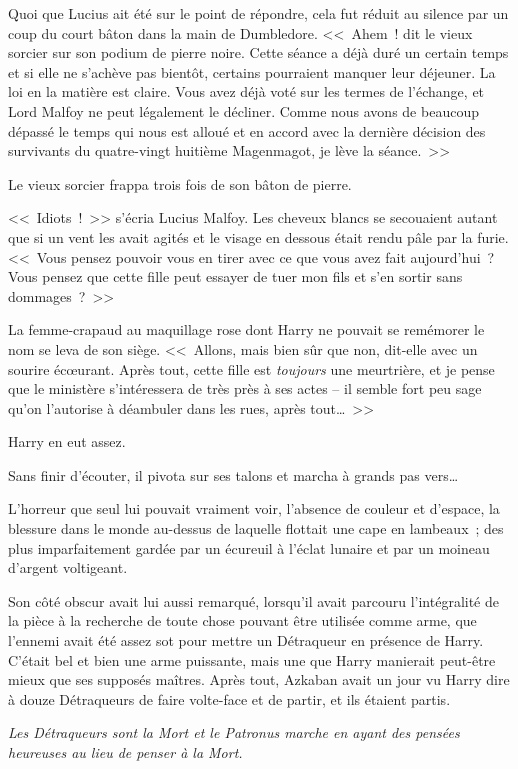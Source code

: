 Quoi que Lucius ait été sur le point de répondre, cela fut réduit au silence par un coup du court bâton dans la main de Dumbledore. <<~Ahem~! dit le vieux sorcier sur son podium de pierre noire. Cette séance a déjà duré un certain temps et si elle ne s'achève pas bientôt, certains pourraient manquer leur déjeuner. La loi en la matière est claire. Vous avez déjà voté sur les termes de l'échange, et Lord Malfoy ne peut légalement le décliner. Comme nous avons de beaucoup dépassé le temps qui nous est alloué et en accord avec la dernière décision des survivants du quatre-vingt huitième Magenmagot, je lève la séance.~>>

Le vieux sorcier frappa trois fois de son bâton de pierre.

<<~Idiots~!~>> s'écria Lucius Malfoy. Les cheveux blancs se secouaient autant que si un vent les avait agités et le visage en dessous était rendu pâle par la furie. <<~Vous pensez pouvoir vous en tirer avec ce que vous avez fait aujourd'hui~? Vous pensez que cette fille peut essayer de tuer mon fils et s'en sortir sans dommages~?~>>

La femme-crapaud au maquillage rose dont Harry ne pouvait se remémorer le nom se leva de son siège. <<~Allons, mais bien sûr que non, dit-elle avec un sourire écœurant. Après tout, cette fille est \emph{toujours} une meurtrière, et je pense que le ministère s'intéressera de très près à ses actes -- il semble fort peu sage qu'on l'autorise à déambuler dans les rues, après tout…~>>

Harry en eut assez.

Sans finir d'écouter, il pivota sur ses talons et marcha à grands pas vers…

L'horreur que seul lui pouvait vraiment voir, l'absence de couleur et d'espace, la blessure dans le monde au-dessus de laquelle flottait une cape en lambeaux~; des plus imparfaitement gardée par un écureuil à l'éclat lunaire et par un moineau d'argent voltigeant.

Son côté obscur avait lui aussi remarqué, lorsqu'il avait parcouru l'intégralité de la pièce à la recherche de toute chose pouvant être utilisée comme arme, que l'ennemi avait été assez sot pour mettre un Détraqueur en présence de Harry. C'était bel et bien une arme puissante, mais une que Harry manierait peut-être mieux que ses supposés maîtres. Après tout, Azkaban avait un jour vu Harry dire à douze Détraqueurs de faire volte-face et de partir, et ils étaient partis.

\emph{Les Détraqueurs sont la Mort et le Patronus marche en ayant des pensées heureuses au lieu de penser à la Mort.}

